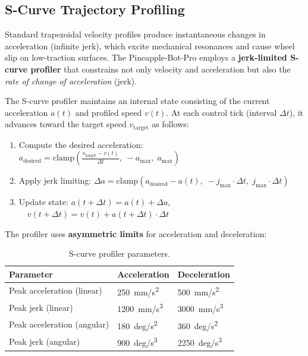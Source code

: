 \documentclass[12pt, a4paper, twoside]{article}
\begin{document}
\subsection{S-Curve Trajectory Profiling}
\label{sec:scurve}

Standard trapezoidal velocity profiles produce instantaneous changes in acceleration (infinite jerk), which excite mechanical resonances and cause wheel slip on low-traction surfaces. The Pineapple-Bot-Pro employs a \textbf{jerk-limited S-curve profiler} that constrains not only velocity and acceleration but also the \emph{rate of change of acceleration} (jerk).

The S-curve profiler maintains an internal state consisting of the current acceleration $a(t)$ and profiled speed $v(t)$. At each control tick (interval $\Delta t$), it advances toward the target speed $v_{\text{target}}$ as follows:

\begin{enumerate}
    \item Compute the desired acceleration: $a_{\text{desired}} = \text{clamp}\!\left(\frac{v_{\text{target}} - v(t)}{\Delta t},\; -a_{\max},\; a_{\max}\right)$

    \item Apply jerk limiting: $\Delta a = \text{clamp}\!\left(a_{\text{desired}} - a(t),\; -j_{\max} \cdot \Delta t,\; j_{\max} \cdot \Delta t\right)$

    \item Update state: $a(t+\Delta t) = a(t) + \Delta a$, $\quad v(t+\Delta t) = v(t) + a(t+\Delta t) \cdot \Delta t$
\end{enumerate}

\noindent The profiler uses \textbf{asymmetric limits} for acceleration and deceleration:

\begin{table}[H]
    \centering
    \caption{S-curve profiler parameters.}
    \label{tab:scurve-params}
    \begin{tabular}{@{}lll@{}}
        \toprule
        \textbf{Parameter} & \textbf{Acceleration} & \textbf{Deceleration} \\
        \midrule
        Peak acceleration (linear) & \SI{250}{mm/s^2}  & \SI{500}{mm/s^2} \\
        Peak jerk (linear)         & \SI{1200}{mm/s^3} & \SI{3000}{mm/s^3} \\
        Peak acceleration (angular) & \SI{180}{deg/s^2} & \SI{360}{deg/s^2} \\
        Peak jerk (angular)         & \SI{900}{deg/s^3} & \SI{2250}{deg/s^3} \\
        \bottomrule
    \end{tabular}
\end{table}
\end{document}
